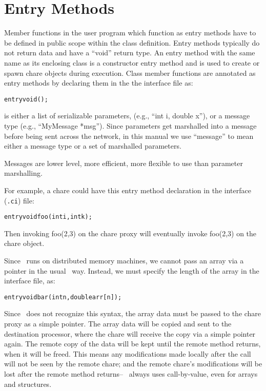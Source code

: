 \section{Entry Methods}
\label{entry}

Member functions in the user program which function as entry methods have to be
defined in public scope within the class definition.
Entry methods typically do not return data and have a ``void'' return type.
An entry method with the same name as its enclosing class is a constructor entry method
and is used to create or spawn chare objects during execution.
Class member functions are annotated as entry methods by declaring them in the
the interface file as:
\begin{alltt}
entry void ();
\end{alltt}

 is either a list of serializable parameters, (e.g., ``int i,
double x''), or a message type (e.g., ``MyMessage *msg'').
Since parameters get marshalled into a message before being sent across the
network, in this manual we use ``message'' to mean either a message type or a
set of marshalled parameters.


Messages are lower level, more efficient, more flexible to use than parameter marshalling.

For example, a chare could have this entry method declaration in 
the interface ({\tt .ci}) file:
\begin{alltt}
  entry void foo(int i,int k);
\end{alltt}
Then invoking foo(2,3) on the chare proxy will eventually
invoke foo(2,3) on the chare object.

Since \charmpp\ runs on distributed memory machines, we cannot
pass an array via a pointer in the usual \CC\ way.  Instead,
we must specify the length of the array in the interface file, as:
\begin{alltt}
  entry void bar(int n,double arr[n]);
\end{alltt}
Since \CC\ does not recognize this syntax, the array data
must be passed to the chare proxy as a simple pointer.
The array data will be copied and sent to the
destination processor, where the chare will receive the copy
via a simple pointer again.  The remote copy of the data
will be kept until the remote method returns, when
it will be freed.  
This means any modifications made locally after the call will not be 
seen by the remote chare; and the remote chare's modifications
will be lost after the remote method returns-- \charmpp\ always 
uses call-by-value, even for arrays and structures.  

